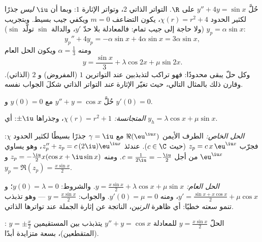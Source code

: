 \begin{example}\label{ex:b1:diffeq:offresonance}
حُلَّ $y'' + 4y = \sin x$ على $\R$. التواتر الذاتي $2$، وتواتر
الإثارة $1$: وبما أن $\iu$ \emph{ليس} جذرًا لكثير الحدود $\chi(r) = r^2
+ 4$، يكون التضاعف $m = 0$ ويكفي جيب بسيط.
وبتجريب $y_p = \alpha\sin x$ (ولا حاجة إلى جيب تمام: فالمعادلة
بلا حدّ $y'$، والدالة $\sin$ تولّد $\sin$):
\[
y_p'' + 4y_p = -\alpha\sin x + 4\alpha\sin x = 3\alpha\sin x ,
\]
ومنه $\alpha = \frac13$ ويكون الحل العام
\[
y = \frac{\sin x}3 + \lambda\cos 2x + \mu\sin 2x .
\]
وكل حلّ يبقى محدودًا: فهو تراكب لتذبذبين
عند التواترين $1$ (المفروض) و $2$ (الذاتي). وقارن ذلك
بالمثال التالي، حيث تغيّر الإثارة \emph{عند} التواتر الذاتي
شكلَ الجواب نفسه.
\end{example}

\begin{example}\label{ex:b1:diffeq:oscillation}
حُلَّ $y'' + y = \cos x$ مع $y(0) = 0$ و $y'(0) = 0$.

\emph{المتجانسة:} $\chi(r) = r^2 + 1$، وجذراها $\pm\iu$: أي $y_h =
\lambda\cos x + \mu \sin x$.

\emph{الحل الخاص:} الطرف الأيمن $\Re(\eu^{\iu x})$ مع $\gamma =
\iu$ جذرًا بسيطًا لكثير الحدود $\chi$: فجرّب $z_p = c\, x\, \eu^{\iu x}$
(حيث $c \in \C$). عندئذ $z_p'' + z_p = c\,(2\iu)\eu^{\iu x}$، وهو يساوي
$\eu^{\iu x}$ من أجل $c = \frac{1}{2\iu} = -\frac\iu2$. ومنه $z_p =
-\frac{\iu}{2} x (\cos x + \iu \sin x)$ و$y_p = \Re(z_p) =
\frac{x \sin x}{2}$.

\emph{الحل العام:} $y = \frac{x\sin x}{2} + \lambda\cos x +
\mu\sin x$. والشروط: $y(0) = \lambda = 0$؛ و$y' = \frac{\sin x +
x\cos x}{2} + \mu\cos x$، ومنه $y'(0) = \mu = 0$. والجواب: $y =
\frac{x\sin x}{2}$ --- وهو تذبذب تنمو سعته خطيًا:
أي ظاهرة \emph{الرنين}، الناتجة عن إثارة
الجملة عند تواترها الذاتي.
\end{example}

\begin{omfigure}

{\small {}: الحلّ $y = \frac{x \sin x}{2}$ للمعادلة $y'' + y =
\cos x$ يتذبذب بين المستقيمين $y = \pm\frac x2$ (المتقطعين)، بسعة
متزايدة أبدًا.}
\end{omfigure}

